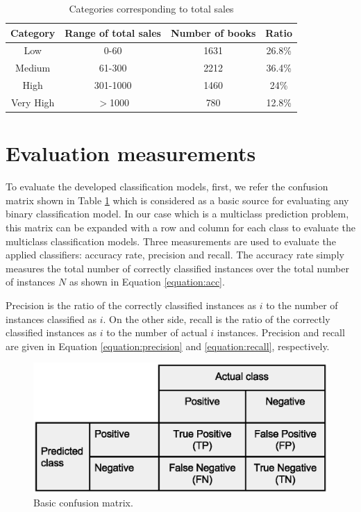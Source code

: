 \documentclass[a4paper,10pt,onecolumn,preprint,3p]{elsarticle}
\begin{document}
\begin{table}[ht]
\caption{Categories corresponding to total sales }
\centering{}%
\begin{tabular}{|c|c|c|c|}
\hline 
Category & Range of total sales & Number of books & Ratio\tabularnewline
\hline 
\hline 
Low & 0-60 & 1631 & 26.8\%\tabularnewline
\hline 
Medium & 61-300 & 2212 & 36.4\%\tabularnewline
\hline 
High & 301-1000 & 1460 & 24\%\tabularnewline
\hline 
Very High & $>$1000 & 780 & 12.8\%\tabularnewline
\hline 
\end{tabular}
\label{table:freq}
\end{table}


\section{Evaluation measurements}
\label{sec:eval_measures}

To evaluate the developed classification models, first, we refer the confusion matrix shown in Table \ref{fig:confusionmatrix} which is considered as a basic source for evaluating any binary classification model. In our case which is a multiclass prediction problem, this matrix can be expanded with a row and column for each class to evaluate the multiclass classification models. Three measurements are used to evaluate the applied classifiers: accuracy rate, precision and recall. The accuracy rate simply measures the total number of correctly classified instances over the total number of instances $N$ as shown in Equation \ref{equation:acc}.

Precision is the ratio of the correctly classified instances as $i$ to the number of instances classified as $i$. On the other side, recall is the ratio of the correctly classified instances as $i$ to the number of actual $i$ instances. Precision and recall are given in Equation \ref{equation:precision} and \ref{equation:recall}, respectively.


\begin{figure}[ht]
\begin{center}
\includegraphics[scale=0.50]{Confusion-matrix}
\end{center}
\caption{Basic confusion matrix.}
\label{fig:confusionmatrix}
\end{figure}
\end{document}

